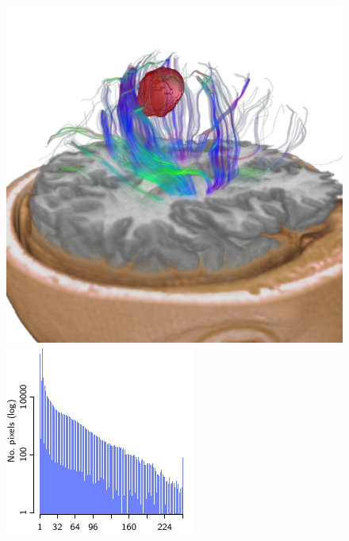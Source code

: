 \documentclass{egpubl}
\begin{document}
\begin{figure}[p]
  \centering
  \begin{minipage}[b]{0.26\linewidth}\centering
    \includegraphics[width=0.98\linewidth]{snapshots/dti/cgf/screenshot_Neuro}%
  \end{minipage}\hfill
  \begin{minipage}[b]{0.22\linewidth}\centering
    \includegraphics{figures/plot-dch-neuro}
  \end{minipage}\hfill
  \begin{minipage}[b]{0.26\linewidth}\centering

\end{minipage}
\end{figure}
\end{document}
